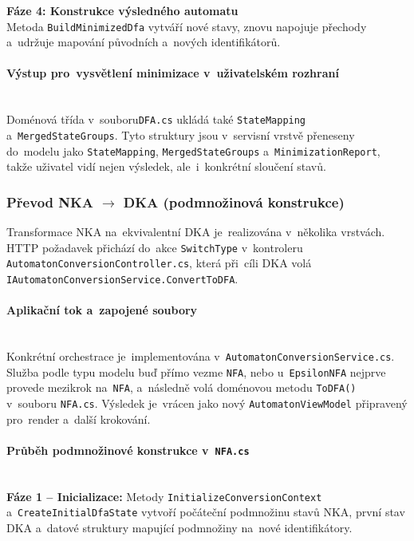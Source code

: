 \documentclass[
  master,
  program=ainfvs,
  printversion,
  figures=false,
  tables=false,
  glossaries,
  index
]{kidiplom}
\begin{document}
\textbf{Fáze 4: Konstrukce výsledného automatu} \\
Metoda \texttt{BuildMinimizedDfa} vytváří nové stavy, znovu napojuje přechody a~udržuje mapování původních a~nových identifikátorů.

\paragraph{Výstup pro~vysvětlení minimizace v~uživatelském rozhraní} \mbox{} \\
Doménová třída v~souboru\texttt{DFA.cs} ukládá také \texttt{StateMapping} a~\texttt{Merged\-State\-Groups}. Tyto struktury jsou v~servisní vrstvě přeneseny do~modelu jako \texttt{StateMapping}, \texttt{MergedStateGroups} a~\texttt{MinimizationReport}, takže uživatel vidí nejen výsledek, ale~i~konkrétní sloučení stavů.

\subsubsection{Převod NKA $\rightarrow$ DKA (podmnožinová konstrukce)}
Transformace \gls{NKA} na~ekvivalentní \gls{DKA} je~realizována v~několika vrstvách. HTTP požadavek přichází do~akce \texttt{SwitchType} v~kontroleru \texttt{Automa\-ton\-Con\-ver\-si\-on\-Con\-tro\-ller.cs}, která při~cíli \gls{DKA} volá \texttt{IAutoma\-ton\-Con\-ver\-si\-on\-Ser\-vi\-ce.Convert\-To\-DFA}.

\paragraph{Aplikační tok a~zapojené soubory} \mbox{} \\
Konkrétní orchestrace je~implementována v~\texttt{AutomatonConversionServi\-ce.cs}. Služba podle typu modelu buď přímo vezme \texttt{NFA}, nebo u~\texttt{EpsilonNFA} nejprve provede mezikrok na~\texttt{NFA}, a~následně volá doménovou metodu \texttt{ToDFA()} v~souboru \texttt{NFA.cs}. Výsledek je~vrácen jako nový \texttt{AutomatonViewModel} připravený pro~render a~další krokování.

\paragraph{Průběh podmnožinové konstrukce v~\texttt{NFA.cs}} \mbox{} \\

\noindent \textbf{Fáze 1 -- Inicializace:} Metody \texttt{Initialize\-Conversion\-Context} a~\texttt{Cre\-a\-te\-Initial\-Dfa\-State} vytvoří počáteční podmnožinu stavů \gls{NKA}, první stav \gls{DKA} a~datové struktury mapující podmnožiny na~nové identifikátory.
\end{document}
